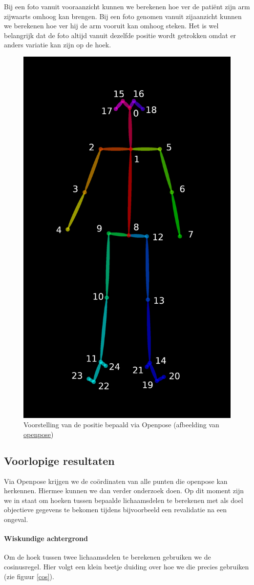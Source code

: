 \documentclass[a4paper,twoside,kulak]{kulakreport}
\begin{document}
Bij een foto vanuit vooraanzicht kunnen we berekenen hoe ver de patiënt zijn arm zijwaarts omhoog kan brengen. Bij een foto genomen vanuit zijaanzicht kunnen we berekenen hoe ver hij de arm vooruit kan omhoog steken. Het is wel belangrijk dat de foto altijd vanuit dezelfde positie wordt getrokken omdat er anders variatie kan zijn op de hoek.



\begin{figure}[H]
	\centering
	\includegraphics[width=.5\textwidth]{HPE_skelet}
	\caption{Voorstelling van de positie bepaald via Openpose (afbeelding van \href{https://github.com/CMU-Perceptual-Computing-Lab/openpose/blob/master/doc/output.md}{openpose})}
	\label{fig:skelet}
\end{figure}


\subsection{Voorlopige resultaten}

Via Openpose krijgen we de coördinaten van alle punten die openpose kan herkennen. Hiermee kunnen we dan verder onderzoek doen. Op dit moment zijn we in staat om hoeken tussen bepaalde lichaamsdelen te berekenen met als doel objectieve gegevens te bekomen tijdens bijvoorbeeld een revalidatie na een ongeval.

\paragraph{Wiskundige achtergrond}
Om de hoek tussen twee lichaamsdelen te berekenen gebruiken we de cosinusregel. Hier volgt een klein beetje duiding over hoe we die precies gebruiken (zie figuur \ref{cos}).\\
\end{document}

